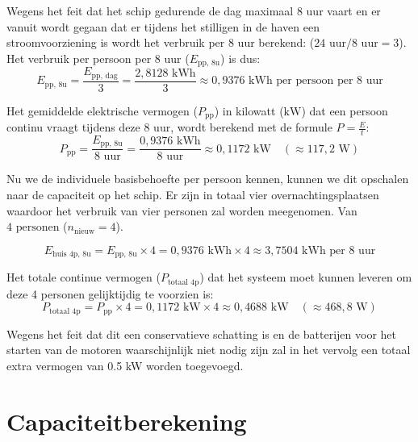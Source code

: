 \noindent Wegens het feit dat het schip gedurende de dag maximaal 8 uur vaart en er vanuit wordt gegaan dat er tijdens het stilligen in de haven een stroomvoorziening is wordt het verbruik per 8 uur berekend: ($24 \text{ uur} / 8 \text{ uur} = 3$). Het verbruik per persoon per 8 uur ($E_{\text{pp, 8u}}$) is dus:
\begin{equation}
E_{\text{pp, 8u}} = \frac{E_{\text{pp, dag}}}{3} = \frac{2{,}8128 \text{ kWh}}{3} \approx 0{,}9376 \text{ kWh per persoon per 8 uur}
\end{equation}

\noindent Het gemiddelde elektrische vermogen ($P_{\text{pp}}$) in kilowatt ($\text{kW}$) dat een persoon continu vraagt tijdens deze 8 uur, wordt berekend met de formule $P = \frac{E}{t}$:
\begin{equation}
P_{\text{pp}} = \frac{E_{\text{pp, 8u}}}{8 \text{ uur}} = \frac{0{,}9376 \text{ kWh}}{8 \text{ uur}} \approx 0{,}1172 \text{ kW} \quad (\approx 117{,}2 \text{ W})
\end{equation}

\noindent Nu we de individuele basisbehoefte per persoon kennen, kunnen we dit opschalen naar de  capaciteit op het schip. Er zijn in totaal vier overnachtingsplaatsen waardoor het verbruik van vier personen zal worden meegenomen. Van $4 \text{ personen}$ ($n_{\text{nieuw}} = 4$).

\begin{equation}
E_{\text{huis 4p, 8u}} = E_{\text{pp, 8u}} \times 4 = 0{,}9376 \text{ kWh} \times 4 \approx 3{,}7504 \text{ kWh per 8 uur}
\end{equation}

\noindent Het totale continue vermogen ($P_{\text{totaal 4p}}$) dat het systeem moet kunnen leveren om deze 4 personen gelijktijdig te voorzien is:
\begin{equation}
P_{\text{totaal 4p}} = P_{\text{pp}} \times 4 = 0{,}1172 \text{ kW} \times 4 \approx 0{,}4688 \text{ kW} \quad (\approx 468{,}8 \text{ W})
\end{equation}

\noindent Wegens het feit dat dit een conservatieve schatting is en de batterijen voor het starten van de motoren waarschijnlijk niet nodig zijn zal in het vervolg een totaal extra vermogen van 0.5 kW worden toegevoegd.

\section{Capaciteitberekening}


